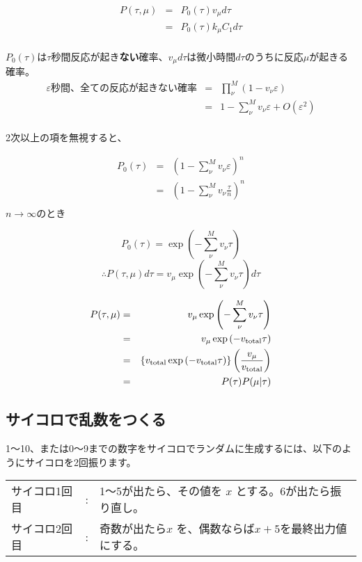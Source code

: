 \begin{eqnarray*}
P(\tau , \mu) & = & P_0 (\tau) v_{\mu} d\tau \\
& = & P_0 (\tau) k_\mu C_1 d\tau \\
\end{eqnarray*}

$P_0 (\tau)$は$\tau$秒間反応が起き{\bf ない}確率、$v_{\mu} d\tau$は微小時間$d\tau$のうちに反応$\mu$が起きる確率。\\

\begin{eqnarray*}
\varepsilon \mbox{秒間、全ての反応が起きない確率} & = & \prod^{M}_{\nu} ( 1 - v_{\nu} \varepsilon )\\
& = & 1 - \sum^{M}_{\nu} v_{\nu} \varepsilon + O(\varepsilon^2)\\
\end{eqnarray*}

2次以上の項を無視すると、

\begin{eqnarray*}
P_0(\tau) & = & \left( 1 - \sum^{M}_{\nu} v_{\nu} \varepsilon \right)^n \\
& = & \left( 1 - \sum^{M}_{\nu} v_{\nu} \frac{\tau}{n} \right)^n \\
\end{eqnarray*}
$n \rightarrow \infty$のとき

\[P_0(\tau) = \exp \left( - \sum^{M}_{\nu} v_{\nu} \tau \right)\]
\[\therefore P(\tau,\mu)d\tau = v_\mu \exp \left( - \sum^{M}_{\nu} v_{\nu} \tau \right)d\tau\]

\begin{eqnarray*}
P(\tau,\mu) & = & v_\mu \exp \left( - \sum^{M}_{\nu} v_{\nu} \tau \right)\\
& = & v_\mu \exp \left( - v_{\rm total} \tau \right)\\
& = & \left\{ v_{\rm total} \exp \left( - v_{\rm total} \tau \right)\right\}\left(\frac{v_\mu}{v_{\rm total}}\right)\\
& = & P(\tau) P(\mu|\tau)\\
\end{eqnarray*}

\subsection{サイコロで乱数をつくる}
1〜10、または0〜9までの数字をサイコロでランダムに生成するには、以下のようにサイコロを2回振ります。\\

\begin{tabular}{lll}
サイコロ1回目 & : & 1〜5が出たら、その値を \(x\) とする。6が出たら振り直し。\\
サイコロ2回目 & : & 奇数が出たら\(x\) を、偶数ならば\(x+5\)を最終出力値にする。\\
\end{tabular}

